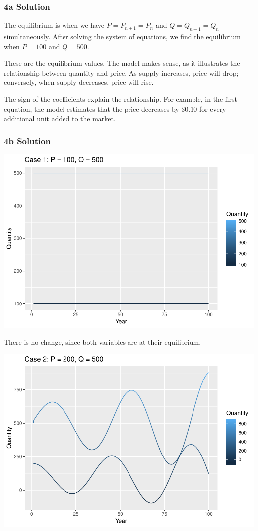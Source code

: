 \documentclass[]{article}
\begin{document}
\hypertarget{a-solution}{%
\subsubsection{4a Solution}\label{a-solution}}

The equilibrium is when we have \(P = P_{n+1} = P_n\) and
\(Q = Q_{n+1} = Q_n\) simultaneously. After solving the system of
equations, we find the equilibrium when \(P = 100\) and \(Q = 500\).

These are the equilibrium values. The model makes sense, as it
illustrates the relationship between quantity and price. As supply
increases, price will drop; conversely, when supply decreases, price
will rise.

The sign of the coefficients explain the relationship. For example, in
the first equation, the model estimates that the price decreases by
\$0.10 for every additional unit added to the market.

\hypertarget{b-solution}{%
\subsubsection{4b Solution}\label{b-solution}}

\includegraphics{DATA_609_Homework_1_files/figure-latex/unnamed-chunk-7-1.pdf}

There is no change, since both variables are at their equilibrium.

\includegraphics{DATA_609_Homework_1_files/figure-latex/unnamed-chunk-8-1.pdf}
\end{document}
